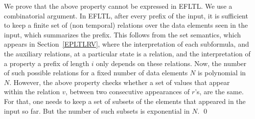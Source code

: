 \documentclass{llncs}
\begin{document}
We prove that the above property cannot be expressed in EFLTL.
We use a combinatorial argument.
In EFLTL, after every prefix of the input, it is
sufficient to keep a finite set of (non temporal) relations over the
data elements seen in the input, which
summarizes the prefix. This follows from the set
semantics, which appears in Section~\ref{EPLTLRV}, 
where the interpretation of
each subformula, and the auxiliary relations,
at a particular state is a relation, and the interpretation 
of a property a prefix of length $i$ only depends on
these relations. Now, the number of such possible relations
for a fixed number of data elements $N$ is polynomial
in $N$. However, the above property checks whether
a set of values that appear within the relation $v$, between two consecutive appearances
of $r$'s, are the same. For that, one needs to keep a set of
subsets of the elements that appeared in the input so far. 
But the number of such subsets is exponential in $N$. \qed


\iffalse
{\bf Comments.} First, note that the reason that QFLTL {\em can} express the property in Theorem~\ref{theo2}, is that it allows to augment the input relations with auxiliary relations that are not fixed. That is, for an auxiliary relation $R$,
$R [ i ]$ is not fixed, and can change per different
prefixes (of length at least $i$), or even in different
subformulas. Second, given a simple extension to EFLTL, where 
one can use a variable that represents an updatable
counter (or a generator of distinct values), one can express the property used in~\ref{theo2}, by
keeping a relation where values between different occurrences of the event $r$ are paired with distinct values, hence, representing an unbounded set of sets.
\fi
\end{document}
